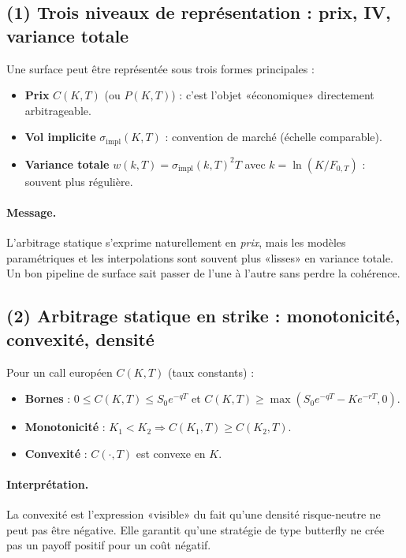 
\subsection*{(1) Trois niveaux de représentation : prix, IV, variance totale}
Une surface peut être représentée sous trois formes principales :
\begin{itemize}[leftmargin=*]
\item \textbf{Prix} $C(K,T)$ (ou $P(K,T)$) : c'est l'objet «économique» directement arbitrageable.
\item \textbf{Vol implicite} $\sigma_{\mathrm{impl}}(K,T)$ : convention de marché (échelle comparable).
\item \textbf{Variance totale} $w(k,T)=\sigma_{\mathrm{impl}}(k,T)^2T$ avec $k=\ln(K/F_{0,T})$ : souvent plus régulière.
\end{itemize}
\paragraph{Message.}
L'arbitrage statique s'exprime naturellement en \emph{prix}, mais les modèles paramétriques et les interpolations sont souvent plus «lisses» en variance totale.
Un bon pipeline de surface sait passer de l'une à l'autre sans perdre la cohérence.

\subsection*{(2) Arbitrage statique en strike : monotonicité, convexité, densité}
Pour un call européen $C(K,T)$ (taux constants) :
\begin{itemize}[leftmargin=*]
\item \textbf{Bornes} : $0\le C(K,T)\le S_0e^{-qT}$ et $C(K,T)\ge \max(S_0e^{-qT}-Ke^{-rT},0)$.
\item \textbf{Monotonicité} : $K_1<K_2 \Rightarrow C(K_1,T)\ge C(K_2,T)$.
\item \textbf{Convexité} : $C(\cdot,T)$ est convexe en $K$.
\end{itemize}
\paragraph{Interprétation.}
La convexité est l'expression «visible» du fait qu'une densité risque-neutre ne peut pas être négative.
Elle garantit qu'une stratégie de type butterfly ne crée pas un payoff positif pour un coût négatif.

